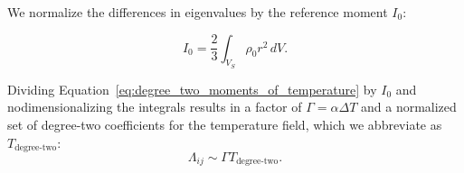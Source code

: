 \documentclass[extra,mreferee]{gji}
\newif\ifdetail
\begin{document}
We normalize the differences in eigenvalues by the reference moment $I_0$:
\ifdetail
\begin{equation}
\begin{aligned}
\int_{V_S} \rho_0 \frac{2 r^2 - Y_{20}^*}{3} &= \int_{V_S} \rho_0 (x^2 + y^2) dV = I_0 \\
\end{aligned}
\end{equation}
\begin{equation}
I_0 = \frac{2}{3} \int_{V_S} \rho_0 r^2 \left(1 - 2 \sqrt{\frac{\pi}{5}} Y_{20}\right) \,dV
\end{equation}
\fi
\begin{equation}
I_0 = \frac{2}{3} \int_{V_S} \rho_0 r^2 \,dV.
\end{equation}
\ifdetail
\begin{equation}
\begin{aligned}
\Lambda_{21} &= \alpha \Delta T \frac{-6 \sqrt{\frac{\pi}{15} } \int_{V_S} T^\prime r^2  Y_{22} \,dV}{\int_{V_S} r^2 \, dV} \\
\Lambda_{31} &= \alpha \Delta T \frac{-3 \sqrt{ \frac{\pi}{15} } \int_{V_S} T^\prime r^2 \left( Y_{22} - \sqrt{3} Y_{20} \right) dV}{\int_{V_S} r^2 \, dV}\\
\Lambda_{32} &= \alpha \Delta T \frac{3 \sqrt{ \frac{\pi}{15} }  \int_{V_S}  T^\prime r^2 \left( Y_{22} + \sqrt{3} Y_{20} \right) dV}{\int_{V_S} r^2 \, dV} \\
\end{aligned}
\end{equation}
\begin{equation}
\begin{aligned}
\Lambda_{21} &= \Gamma \frac{-6 \sqrt{\frac{\pi}{15} } \int_{V_S^\prime} T^\prime {r^\prime}^2  Y_{22} \,dV^\prime}{\int_{V_S^\prime} {r^\prime}^2 \,dV^\prime} \\
\Lambda_{31} &= \Gamma \frac{-3 \sqrt{ \frac{\pi}{15} } \int_{V_S^\prime} T^\prime {r^\prime}^2 \left( Y_{22} - \sqrt{3} Y_{20} \right) dV^\prime}{\int_{V_S} {r^\prime}^2 \, dV^\prime}\\
\Lambda_{32} &= \Gamma \frac{3 \sqrt{ \frac{\pi}{15} }  \int_{V_S^\prime}  T^\prime {r^\prime}^2 \left( Y_{22} + \sqrt{3} Y_{20} \right) dV^\prime}{\int_{V_S} {r^\prime}^2 \, dV^\prime} \\
\end{aligned}
\end{equation}
\fi
Dividing Equation~\eqref{eq:degree_two_moments_of_temperature} by $I_0$ and nodimensionalizing 
the integrals results in a factor of $\Gamma = \alpha \Delta T$ and a normalized set of 
degree-two coefficients for the temperature field, which we abbreviate as $T_{\text{degree-two}}$:
\begin{equation}
\Lambda_{ij} \sim \Gamma T_{\text{degree-two}}.
\end{equation}

\label{lastpage}
\end{document}
